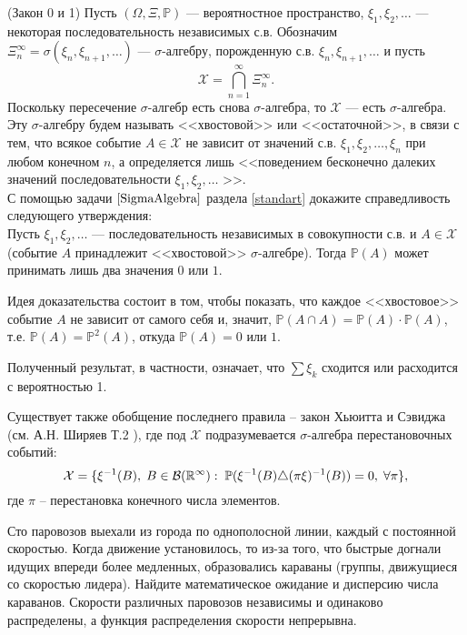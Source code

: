 \begin{problem}(Закон 0 и 1)
Пусть $(\Omega,\Xi,{\mathbb P})$ --- вероятностное пространство, $\xi_1,\xi_2,\ldots$ --- некоторая последовательность независимых с.в. 
Обозначим $\Xi_n^{\infty}=\sigma(\xi_{n},\xi_{n+1},\ldots)$ --- $\sigma$-алгебру, порожденную с.в. $\xi_{n},\xi_{n+1},\ldots$ и пусть 
$$
{\mathcal X}=\bigcap\limits_{n=1}^{\infty} \Xi_{n}^{\infty} . 
$$
Поскольку пересечение $\sigma$-алгебр есть снова $\sigma$-алгебра, то ${\mathcal X}$ --- есть $\sigma$-алгебра. Эту $\sigma$-алгебру 
будем называть <<хвостовой>> или <<остаточной>>, в связи с тем, что всякое событие $A\in{\mathcal X}$ не зависит от значений с.в. 
$\xi_1,\xi_2,\ldots,\xi_n$ при любом конечном $n$, а определяется лишь <<поведением бесконечно далеких значений последовательности 
$\xi_1,\xi_2,\ldots$ >>. \\
\noindent С помощью задачи $\ref{SigmaAlgebra}$ раздела \ref{standart} докажите справедливость следующего утверждения: \\

Пусть $\xi_1,\xi_2,\ldots$ --- последовательность независимых в совокупности с.в. и $A\in{\mathcal X}$ 
(событие $A$ принадлежит <<хвостовой>> $\sigma$-алгебре). Тогда ${\mathbb P}(A)$ может принимать лишь два значения $0$ или $1$. 
\end{problem}

\begin{ordre}
Идея доказательства состоит в том, чтобы показать, что каждое <<хвостовое>> событие $A$ не зависит от самого себя и, значит, 
${\mathbb P}(A\cap A)={\mathbb P}(A)\cdot {\mathbb P}(A)$, т.е. ${\mathbb P}(A)={\mathbb P}^2(A)$, откуда 
${\mathbb P}(A)=0$ или $1$. 

Полученный результат, в частности, означает, что $\sum  \xi_k$ сходится или расходится с вероятностью 1.  

Существует также обобщение последнего правила -- закон Хьюитта и Сэвиджа (см. А.Н. Ширяев Т.2 \cite{21}), где под ${\mathcal X}$ подразумевается $\sigma$-алгебра перестановочных событий:
\[
\mathcal{X} = \{ \xi^{-1}(B), \; B \in \mathcal{B}(\mathbb{R}^{\infty}): \;
\mathrm{{\mathbb P}} (\xi^{-1}(B) \triangle (\pi\xi)^{-1}(B)) = 0, \; \forall \pi \}, 
\] 
где $\pi$ -- перестановка конечного числа элементов.
\end{ordre}

\begin{problem}
Сто паровозов выехали из города по однополосной линии, каждый с постоянной скоростью. Когда движение установилось, то из-за того, что быстрые догнали идущих впереди более медленных, образовались караваны (группы, движущиеся со скоростью лидера). Найдите математическое ожидание и дисперсию числа караванов. Скорости различных паровозов независимы и одинаково распределены, а функция распределения скорости непрерывна.
\end{problem}

